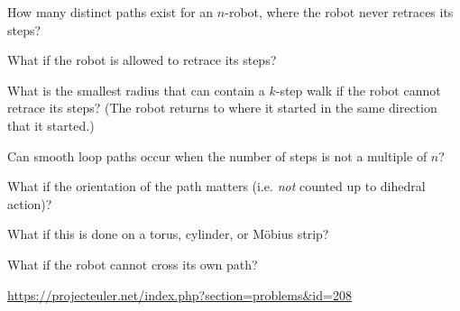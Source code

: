 \documentclass{article}
\begin{document}
\begin{related}
  \item How many distinct paths exist for an $n$-robot, where the robot never
    retraces its steps?
  \item What if the robot is allowed to retrace its steps?
  \item What is the smallest radius that can contain a $k$-step walk if the robot
    cannot retrace its steps?
    (The robot returns to where it started in the same direction that it
    started.)
  \item Can smooth loop paths occur when the number of steps is not a multiple
    of $n$?
  \item What if the orientation of the path matters (i.e. \textit{not} counted
    up to dihedral action)?
  \item What if this is done on a torus, cylinder, or M\"obius strip?
  \item What if the robot cannot cross its own path?
\end{related}
\begin{references}
  \item \url{https://projecteuler.net/index.php?section=problems&id=208}
\end{references}
\end{document}
